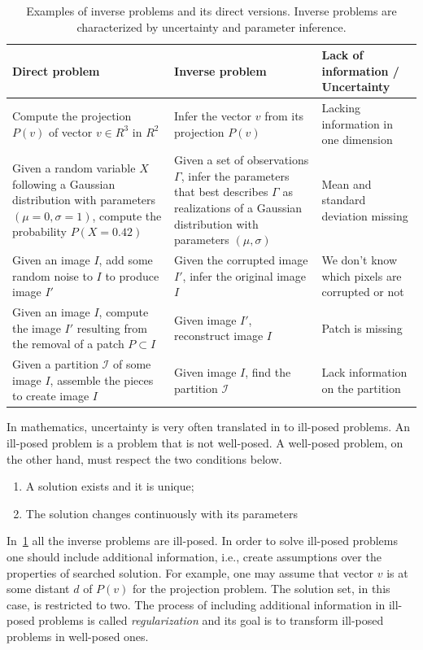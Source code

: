 \begin{table}
\footnotesize
\begin{tabular}{|m{6cm}|m{5cm}|m{5cm}|}
\hline
Direct problem & Inverse problem & Lack of information / Uncertainty \\
\hline
Compute the projection $P(v)$ of vector $v \in R^3$ in $R^2$ & Infer the vector $v$ from its projection $P(v)$ & Lacking information in one dimension\\
\hline
Given a random variable $X$ following a Gaussian distribution with parameters $(\mu=0,\sigma=1)$, compute the probability $P(X=0.42)$ & Given a set of observations $\Gamma$, infer the parameters that best describes $\Gamma$ as realizations of a Gaussian distribution with parameters $(\mu,\sigma)$ &  Mean and standard deviation missing\\
\hline
Given an image $I$, add some random noise to $I$ to produce image $I'$ & Given the corrupted image $I'$, infer the original image $I$ & We don't know which pixels are corrupted or not \\
\hline
Given an image $I$, compute the image $I'$ resulting from the removal of a patch $P \subset  I$ & Given image $I'$, reconstruct image $I$ & Patch is missing\\
\hline
Given a partition $\mathcal{I}$ of some image $I$, assemble the pieces to create image $I$ & Given image $I$, find the partition $\mathcal{I}$ & Lack information on the partition\\
\hline
\end{tabular}
\caption{Examples of inverse problems and its direct versions. Inverse problems are characterized by uncertainty and parameter inference. }
\label{ch1:tab:inverse-problems-list}
\end{table}

In mathematics, uncertainty is very often translated in to ill-posed problems. An ill-posed problem is a problem that is not well-posed. A well-posed problem, on the other hand, must respect the two conditions below.

\begin{enumerate}
\item{A solution exists and it is unique;}
\item{The solution changes continuously with its parameters}
\end{enumerate}



In~\cref{ch1:tab:inverse-problems-list} all the inverse problems are ill-posed. In order to solve ill-posed problems one should include additional information, i.e., create assumptions over the properties of searched solution. For example, one may assume that vector $v$ is at some distant $d$ of $P(v)$ for the projection problem. The solution set, in this case, is restricted to two. The process of including additional information in ill-posed problems is called \emph{regularization} and its goal is to transform ill-posed problems in well-posed ones.

